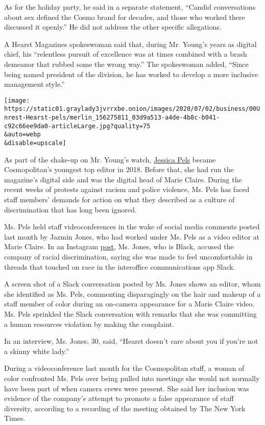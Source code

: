As for the holiday party, he said in a separate statement, ``Candid
conversations about sex defined the Cosmo brand for decades, and those
who worked there discussed it openly.'' He did not address the other
specific allegations.

A Hearst Magazines spokeswoman said that, during Mr. Young's years as
digital chief, his ``relentless pursuit of excellence was at times
combined with a brash demeanor that rubbed some the wrong way.'' The
spokeswoman added, ``Since being named president of the division, he has
worked to develop a more inclusive management style.''

\texttt{[image: https://static01.graylady3jvrrxbe.onion/images/2020/07/02/business/00Unrest-Hearst-pels/merlin\_156275811\_03d9a513-a4de-4b8c-b041-c92c66ee9da0-articleLarge.jpg?quality=75\\\&auto=webp\\\&disable=upscale]}

As part of the shake-up on Mr. Young's watch,
\href{https://www.nytimes3xbfgragh.onion/2019/04/05/style/cosmopolitan-magazine-jessica-pels.html}{Jessica
Pels} became Cosmopolitan's youngest top editor in 2018. Before that,
she had run the magazine's digital side and was the digital head of
Marie Claire. During the recent weeks of protests against racism and
police violence, Ms. Pels has faced staff members' demands for action on
what they described as a culture of discrimination that has long been
ignored.

Ms. Pels held staff videoconferences in the wake of social media
comments posted last month by Jazmin Jones, who had worked under Ms.
Pels as a video editor at Marie Claire. In an Instagram
\href{https://www.instagram.com/p/CBGjWu1jXQC/?utm_source=ig_web_copy_link}{post},
Ms. Jones, who is Black, accused the company of racial discrimination,
saying she was made to feel uncomfortable in threads that touched on
race in the interoffice communications app Slack.

A screen shot of a Slack conversation posted by Ms. Jones shows an
editor, whom she identified as Ms. Pels, commenting disparagingly on the
hair and makeup of a staff member of color during an on-camera
appearance for a Marie Claire video. Ms. Pels sprinkled the Slack
conversation with remarks that she was committing a human resources
violation by making the complaint.

In an interview, Ms. Jones, 30, said, ``Hearst doesn't care about you if
you're not a skinny white lady.''

During a videoconference last month for the Cosmopolitan staff, a woman
of color confronted Ms. Pels over being pulled into meetings she would
not normally have been part of when camera crews were present. She said
her inclusion was evidence of the company's attempt to promote a false
appearance of staff diversity, according to a recording of the meeting
obtained by The New York Times.

